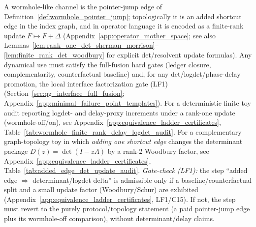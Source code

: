 \begin{remark}
\begin{enumerate}
A wormhole-like channel is the pointer-jump edge of Definition~\ref{def:wormhole_pointer_jump};
topologically it is an added shortcut edge in the index graph, and in operator language it is encoded as a finite-rank update $F\mapsto F+\Delta$
(Appendix~\ref{app:operator_mother_space}; see also Lemmas~\ref{lem:rank_one_det_sherman_morrison}--\ref{lem:finite_rank_det_woodbury} for explicit det/resolvent update formulas).
Any dynamical use must satisfy the full-fusion hard gates (ledger closure, complementarity, counterfactual baseline) and, for any det/logdet/phase-delay promotion, the local interface factorization gate (LF1)
(Section~\ref{sec:qg_interface_full_fusion}; Appendix~\ref{app:minimal_failure_point_templates}).
For a deterministic finite toy audit reporting logdet- and delay-proxy increments under a rank-one update (wormhole-off/on), see
Appendix~\ref{app:equivalence_ladder_certificates}, Table~\ref{tab:wormhole_finite_rank_delay_logdet_audit}.
For a complementary graph-topology toy in which \emph{adding one shortcut edge} changes the determinant package $D(z)=\det(I-zA)$ by a rank-2 Woodbury factor, see
Appendix~\ref{app:equivalence_ladder_certificates}, Table~\ref{tab:added_edge_det_update_audit}.
\emph{Gate-check (LF1):} the step ``added edge $\Rightarrow$ determinant/logdet delta'' is admissible only if a baseline/counterfactual split and a small update factor (Woodbury/Schur) are exhibited (Appendix~\ref{app:equivalence_ladder_certificates}, LF1/C15).
If not, the step must revert to the purely protocol/topology statement (a paid pointer-jump edge plus its wormhole-off comparison), without determinant/delay claims.


\end{enumerate}
\end{remark}
